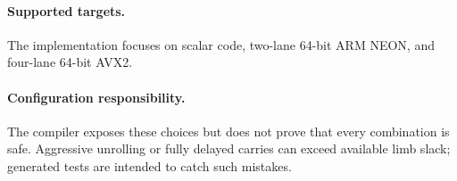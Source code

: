 \paragraph{Supported targets.}
The implementation focuses on scalar code, two-lane 64-bit ARM NEON, and four-lane 64-bit AVX2.

\paragraph{Configuration responsibility.}
The compiler exposes these choices but does not prove that every combination is safe. Aggressive unrolling or fully delayed carries can exceed available limb slack; generated tests are intended to catch such mistakes.
